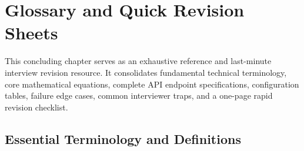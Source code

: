\documentclass[11pt,a4paper,oneside]{report}
\begin{document}


\chapter{Glossary and Quick Revision Sheets}
\label{ch:glossary_revision}

This concluding chapter serves as an exhaustive reference and last-minute interview revision resource. It consolidates fundamental technical terminology, core mathematical equations, complete API endpoint specifications, configuration tables, failure edge cases, common interviewer traps, and a one-page rapid revision checklist.

\section{Essential Terminology and Definitions}
\label{sec:glossary_terms}
\end{document}
